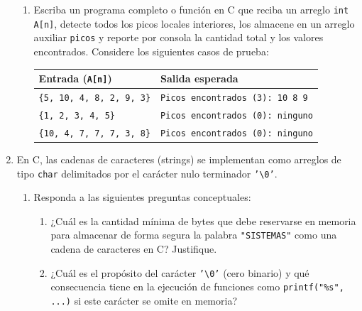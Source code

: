 \documentclass[11pt,letterpaper]{article}
\begin{document}
\begin{enumerate}[label=\textbf{\arabic*.}]
\begin{enumerate}[label=(\alph*)]
        \item Escriba un programa completo o función en C que reciba un arreglo \texttt{int A[n]}, detecte todos los picos locales interiores, los almacene en un arreglo auxiliar \texttt{picos} y reporte por consola la cantidad total y los valores encontrados. Considere los siguientes casos de prueba:
        
        \begin{center}
        \begin{tabular}{ll}
        \toprule
        \textbf{Entrada (\texttt{A[n]})} & \textbf{Salida esperada} \\
        \midrule
        \texttt{\{5, 10, 4, 8, 2, 9, 3\}} & \texttt{Picos encontrados (3): 10 8 9} \\
        \texttt{\{1, 2, 3, 4, 5\}} & \texttt{Picos encontrados (0): ninguno} \\
        \texttt{\{10, 4, 7, 7, 7, 3, 8\}} & \texttt{Picos encontrados (0): ninguno} \\
        \bottomrule
        \end{tabular}
        \end{center}
        \vspace{6cm}
    \end{enumerate}

    \newpage

    \item En C, las cadenas de caracteres (strings) se implementan como arreglos de tipo \texttt{char} delimitados por el carácter nulo terminador \texttt{'\textbackslash 0'}.
    
    \begin{enumerate}[label=(\alph*)]
        \item Responda a las siguientes preguntas conceptuales:
        \begin{enumerate}[label=\arabic*.]
            \item ¿Cuál es la cantidad mínima de bytes que debe reservarse en memoria para almacenar de forma segura la palabra \texttt{"SISTEMAS"} como una cadena de caracteres en C? Justifique.
            \item ¿Cuál es el propósito del carácter \texttt{'\textbackslash 0'} (cero binario) y qué consecuencia tiene en la ejecución de funciones como \texttt{printf("\%s", ...)} si este carácter se omite en memoria?
        \end{enumerate}
        \vspace{4cm}


\end{enumerate}
\end{enumerate}
\end{document}
